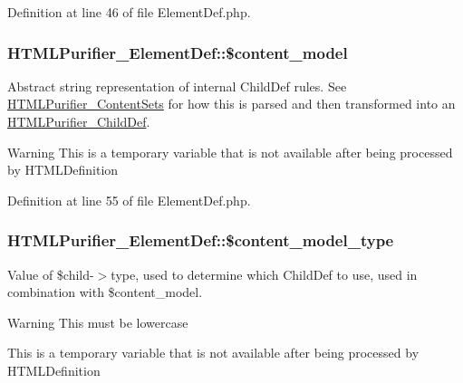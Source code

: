 Definition at line 46 of file Element\+Def.\+php.

\hypertarget{classHTMLPurifier__ElementDef_a629aecb03bfd09763b4f22d6153e845b}{
\subsubsection[{\$content\+\_\+model}]{\setlength{\rightskip}{0pt plus 5cm}H\+T\+M\+L\+Purifier\+\_\+\+Element\+Def\+::\$content\+\_\+model}}\label{classHTMLPurifier__ElementDef_a629aecb03bfd09763b4f22d6153e845b}
Abstract string representation of internal Child\+Def rules. See \hyperlink{classHTMLPurifier__ContentSets}{H\+T\+M\+L\+Purifier\+\_\+\+Content\+Sets} for how this is parsed and then transformed into an \hyperlink{classHTMLPurifier__ChildDef}{H\+T\+M\+L\+Purifier\+\_\+\+Child\+Def}. \begin{DoxyWarning}{Warning}
This is a temporary variable that is not available after being processed by H\+T\+M\+L\+Definition 
\end{DoxyWarning}


Definition at line 55 of file Element\+Def.\+php.

\hypertarget{classHTMLPurifier__ElementDef_a0371f4fa7ff6a8fdd55aa949df833f38}{
\subsubsection[{\$content\+\_\+model\+\_\+type}]{\setlength{\rightskip}{0pt plus 5cm}H\+T\+M\+L\+Purifier\+\_\+\+Element\+Def\+::\$content\+\_\+model\+\_\+type}}\label{classHTMLPurifier__ElementDef_a0371f4fa7ff6a8fdd55aa949df833f38}
Value of \$child-\/$>$type, used to determine which Child\+Def to use, used in combination with \$content\+\_\+model. \begin{DoxyWarning}{Warning}
This must be lowercase 

This is a temporary variable that is not available after being processed by H\+T\+M\+L\+Definition 
\end{DoxyWarning}


